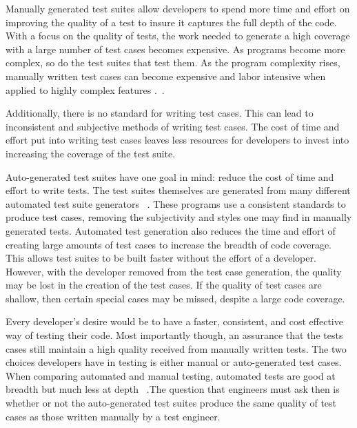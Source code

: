 \documentclass[conference]{IEEEtran}
\begin{document}
Manually generated test suites allow developers to spend more time and effort on improving the quality of a test to insure it captures the full depth of the code. With a focus on the quality of tests, the work needed to generate a high coverage with a large number of test cases becomes expensive. As programs become more complex, so do the test suites that test them. As the program complexity rises, manually written test cases can become expensive and labor intensive when applied to highly complex features .~\cite{clarke1998automated}.

Additionally, there is no standard for writing test cases. This can lead to inconsistent and subjective methods of writing test cases. The cost of time and effort put into writing test cases leaves less resources for developers to invest into increasing the coverage of the test suite.

Auto-generated test suites have one goal in mind: reduce the cost of time and effort to write tests. The test suites themselves are generated from many different automated test suite generators ~\cite{Fraser:2011:EAT:2025113.2025179, Zhang:2011:PHA:1985793.1986036, Marinov:2001:TNF:872023.872551}. These programs use a consistent standards to produce test cases, removing the subjectivity and styles one may find in manually generated tests. Automated test generation also reduces the time and effort of creating large amounts of test cases to increase the breadth of code coverage. This allows test suites to be built faster without the effort of a developer. However, with the developer removed from the test case generation, the quality may be lost in the creation of the test cases. If the quality of test cases are shallow, then certain special cases may be missed, despite a large code coverage.

Every developer's desire would be to have a faster, consistent, and cost effective way of testing their code. Most importantly though, an assurance that the tests cases still maintain a high quality received from manually written tests. The two choices developers have in testing is either manual or auto-generated test cases. When comparing automated and manual testing, automated tests are good at breadth but much less at depth ~\cite{4076909}.The question that engineers must ask then is whether or not the auto-generated test suites produce the same quality of test cases as those written manually by a test engineer. 
\end{document}
